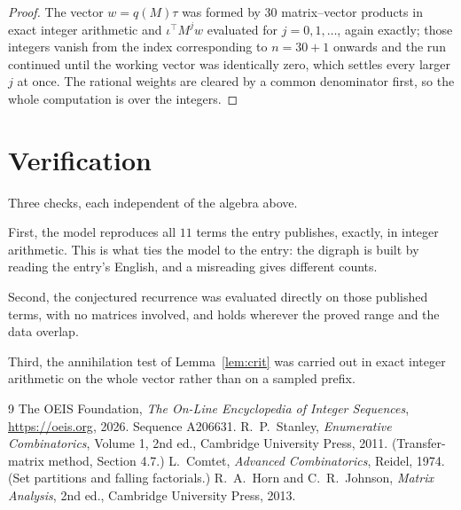 \documentclass[11pt,a4paper]{article}
\theoremstyle{plain}
\theoremstyle{definition}
\begin{document}
\begin{proof}
The vector $w=q(M)\tau$ was formed by $30$ matrix--vector products in exact integer
arithmetic and $\iota^{\!\top}M^{j}w$ evaluated for $j=0,1,\dots$, again exactly; those
integers vanish from the index corresponding to $n=30+1$ onwards and the run continued
until the working vector was identically zero, which settles every larger $j$ at once. The
rational weights are cleared by a common denominator first, so the whole computation is over
the integers.
\end{proof}

\section{Verification}

Three checks, each independent of the algebra above.

First, the model reproduces all $11$ terms the entry publishes, exactly, in integer
arithmetic. This is what ties the model to the entry: the digraph is built by reading the
entry's English, and a misreading gives different counts.

Second, the conjectured recurrence was evaluated directly on those published terms, with no
matrices involved, and holds wherever the proved range and the data overlap.

Third, the annihilation test of Lemma~\ref{lem:crit} was carried out in exact integer
arithmetic on the whole vector rather than on a sampled prefix.

\begin{thebibliography}{9}
 The OEIS Foundation, \emph{The On-Line Encyclopedia of Integer
Sequences}, \url{https://oeis.org}, 2026. Sequence A206631.
 R.~P.~Stanley, \emph{Enumerative Combinatorics}, Volume 1, 2nd ed.,
Cambridge University Press, 2011. (Transfer-matrix method, Section 4.7.)
 L.~Comtet, \emph{Advanced Combinatorics}, Reidel, 1974. (Set partitions
and falling factorials.)
 R.~A.~Horn and C.~R.~Johnson, \emph{Matrix Analysis}, 2nd ed., Cambridge
University Press, 2013.
\end{thebibliography}
\end{document}
